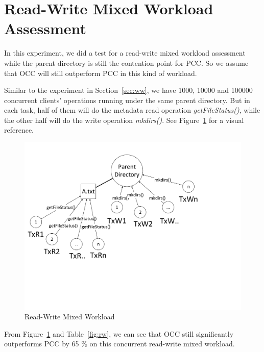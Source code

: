 \section{Read-Write Mixed Workload Assessment}

In this experiment, we did a test for a read-write mixed workload assessment while the parent directory is still the contention point for PCC. So we assume that OCC will still outperform PCC in this kind of workload. 

\noindent Similar to the experiment in Section~\ref{sec:ww}, we have 1000, 10000 and 100000 concurrent clients' operations running under the same parent directory. But in each task, half of them will do the metadata read operation \textit{getFileStatus()}, while the other half will do the write operation \textit{mkdirs()}. See Figure~\ref{fig:rwWorkload} for a visual reference.

\begin{figure}[ht]
	\centering
	\includegraphics[scale=0.6]{figs/rw.pdf}
	\caption{Read-Write Mixed Workload}
	\label{fig:rwWorkload}
\end{figure}

\noindent From Figure~\ref{fig:rwWorkload} and Table~\ref{fig:rw}, we can see that OCC still significantly outperforms PCC by 65 \% on this concurrent read-write mixed workload. 

